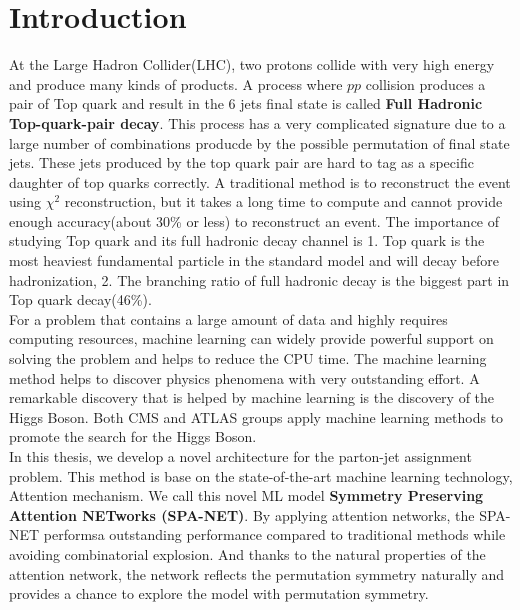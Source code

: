 
\chapter{Introduction} 

\newcommand{\comment}[1]{}

At the Large Hadron Collider(LHC), two protons collide with very high energy and produce many kinds of products. A process where $pp$ collision produces a pair of Top quark and result in the 6 jets final state is called \textbf{Full Hadronic Top-quark-pair decay}. This process has a very complicated signature due to a large number of combinations producde by the possible permutation of final state jets. These jets produced by the top quark pair are hard to tag as a specific daughter of top quarks correctly. A traditional method is to reconstruct the event using $\chi^{2}$ reconstruction, but it takes a long time to compute and cannot provide enough accuracy(about 30\% or less) to reconstruct an event. The importance of studying Top quark and its full hadronic decay channel is 1. Top quark is the most heaviest  fundamental particle in the standard model and will decay before hadronization, 2. The branching ratio of full hadronic decay is the biggest part in Top quark decay(46\%). 
\\
For a problem that contains a large amount of data and highly requires computing resources, machine learning can widely provide powerful support on solving the problem and helps to reduce the CPU time. The machine learning method helps to discover physics phenomena with very outstanding effort. A remarkable discovery that is  helped by machine learning is the discovery of the Higgs Boson. Both CMS and ATLAS groups apply machine learning methods to promote the search for the Higgs Boson. \cite{Aad:2012tfa}\cite{Chatrchyan:2012ufa}
\\
In this thesis, we develop a novel architecture for the  parton-jet assignment problem. This method is base on the state-of-the-art machine learning technology, Attention mechanism.\cite{A.Vaswani:2017} We call this novel ML model \textbf{Symmetry Preserving Attention NETworks (SPA-NET)}. By applying attention networks, the SPA-NET performsa outstanding performance compared to traditional methods while avoiding combinatorial explosion. And thanks to the natural properties of the attention network, the network reflects the permutation symmetry naturally and provides a chance to explore the model with permutation symmetry. 
